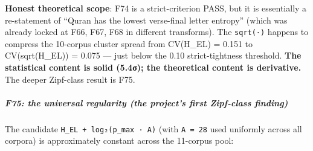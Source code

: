 \documentclass[
]{article}
\begin{document}
\textbf{Honest theoretical scope}: F74 is a strict-criterion PASS, but
it is essentially a re-statement of ``Quran has the lowest verse-final
letter entropy'' (which was already locked at F66, F67, F68 in different
transforms). The \texttt{sqrt(·)} happens to compress the 10-corpus
cluster spread from CV(H\_EL) = 0.151 to CV(sqrt(H\_EL)) = 0.075 ---
just below the 0.10 strict-tightness threshold. \textbf{The statistical
content is solid (5.4σ); the theoretical content is derivative.} The
deeper Zipf-class result is F75.

\subparagraph{F75: the universal regularity (the project's first
Zipf-class
finding)}\label{f75-the-universal-regularity-the-projects-first-zipf-class-finding}

The candidate \texttt{H\_EL\ +\ log₂(p\_max\ ·\ A)} (with
\texttt{A\ =\ 28} used uniformly across all corpora) is approximately
constant across the 11-corpus pool:
\end{document}
